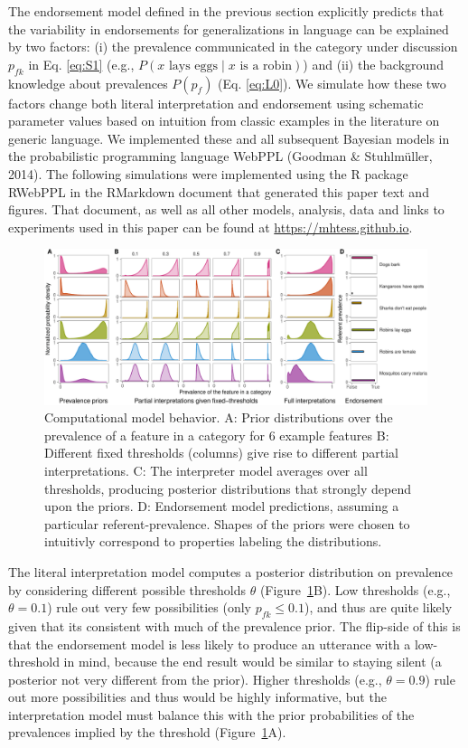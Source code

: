 \documentclass[english,floatsintext,man]{apa6}
\theoremstyle{definition}
\theoremstyle{definition}
\theoremstyle{definition}
\theoremstyle{remark}
\begin{document}
The endorsement model defined in the previous section explicitly
predicts that the variability in endorsements for generalizations in
language can be explained by two factors: (i) the prevalence
communicated in the category under discussion \(p_{fk}\) in Eq.
\ref{eq:S1} (e.g., \(P(x \text{ lays eggs} \mid x \text{ is a robin})\))
and (ii) the background knowledge about prevalences \(P(p_f)\) (Eq.
\ref{eq:L0}). We simulate how these two factors change both literal
interpretation and endorsement using schematic parameter values based on
intuition from classic examples in the literature on generic language.
We implemented these and all subsequent Bayesian models in the
probabilistic programming language WebPPL (Goodman \& Stuhlmüller,
2014). The following simulations were implemented using the R package
RWebPPL in the RMarkdown document that generated this paper text and
figures. That document, as well as all other models, analysis, data and
links to experiments used in this paper can be found at
\url{https://mhtess.github.io}.

\begin{figure}[htbp]
\centering
\includegraphics{figs/simulations-1.pdf}
\caption{\label{fig:simulations}Computational model behavior. A: Prior
distributions over the prevalence of a feature in a category for 6
example features B: Different fixed thresholds (columns) give rise to
different partial interpretations. C: The interpreter model averages
over all thresholds, producing posterior distributions that strongly
depend upon the priors. D: Endorsement model predictions, assuming a
particular referent-prevalence. Shapes of the priors were chosen to
intuitivly correspond to properties labeling the distributions.}
\end{figure}

The literal interpretation model computes a posterior distribution on
prevalence by considering different possible thresholds \(\theta\)
(Figure~\ref{fig:simulations}B). Low thresholds (e.g., \(\theta = 0.1\))
rule out very few possibilities (only \(p_{fk} \leq 0.1\)), and thus are
quite likely given that its consistent with much of the prevalence
prior. The flip-side of this is that the endorsement model is less
likely to produce an utterance with a low-threshold in mind, because the
end result would be similar to staying silent (a posterior not very
different from the prior). Higher thresholds (e.g., \(\theta = 0.9\))
rule out more possibilities and thus would be highly informative, but
the interpretation model must balance this with the prior probabilities
of the prevalences implied by the threshold
(Figure~\ref{fig:simulations}A).
\end{document}
